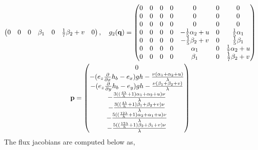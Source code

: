 \begin{gather}
\begin{pmatrix}
      0 & 0 & 0 & \beta_{1} & 0 & \frac{1}{7} \beta_{2} + v & 0
    \end{pmatrix}, \quad
    g_2(\mathbf{q}) =
    \begin{pmatrix}
      0 & 0 & 0 & 0 & 0 & 0 & 0 \\
      0 & 0 & 0 & 0 & 0 & 0 & 0 \\
      0 & 0 & 0 & 0 & 0 & 0 & 0 \\
      0 & 0 & 0 & 0 & -\frac{1}{5} \alpha_{2} + u & 0 & \frac{1}{5} \alpha_{1} \\
      0 & 0 & 0 & 0 & -\frac{1}{5} \beta_{2} + v & 0 & \frac{1}{5} \beta_{1} \\
      0 & 0 & 0 & 0 & \alpha_{1} & 0 & \frac{1}{7} \alpha_{2} + u \\
      0 & 0 & 0 & 0 & \beta_{1} & 0 & \frac{1}{7} \beta_{2} + v
    \end{pmatrix} \\
    \mathbf{p} =
    \begin{pmatrix}
      0 \\
      -{(e_{z} \frac{\partial}{\partial x}h_{b} - e_{x})} g h - \frac{\nu {(\alpha_{1} + \alpha_{2} + u)}}{\lambda} \\
      -{(e_{z} \frac{\partial}{\partial y}h_{b} - e_{y})} g h - \frac{\nu {(\beta_{1} + \beta_{2} + v)}}{\lambda} \\
      -\frac{3 {({(\frac{4 \lambda}{h} + 1)} \alpha_{1} + \alpha_{2} + u)} \nu}{\lambda} \\
      -\frac{3 {({(\frac{4 \lambda}{h} + 1)} \beta_{1} + \beta_{2} + v)} \nu}{\lambda} \\
      -\frac{5 {({(\frac{12 \lambda}{h} + 1)} \alpha_{2} + \alpha_{1} + u)} \nu}{\lambda} \\
      -\frac{5 {({(\frac{12 \lambda}{h} + 1)} \beta_{2} + \beta_{1} + v)} \nu}{\lambda}
    \end{pmatrix}
  \end{gather}
  The flux jacobians are computed below as,
